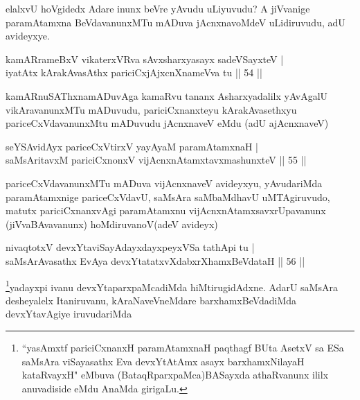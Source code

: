 \begin{artha}
elalxvU hoVgidedx Adare inunx beVre yAvudu uLiyuvudu? A jiVvanige paramAtamxna BeVdavanunxMTu  mADuva jAcnxnavoMdeV uLidiruvudu, adU avideyxye.
\end{artha}

\begin{shl}
kamAR\s \s rameBxV vikaterxVRva sAvxsharxyasayx sadeVSayxteV |\\
iyatAtx kArakAvasAthx pariciCxjAjxcnXnameVva tu \hfill || 54 ||
\end{shl}

\begin{artha}
kamARnuSAThxnamADuvAga kamaRvu tananx Asharxyadalilx yAvAgalU vikAravanunxMTu mADuvudu, pariciCxnanxteyu kArakAvasethxyu pariceCxVdavanunxMtu mADuvudu jAcnxnaveV eMdu (adU ajAcnxnaveV)
\end{artha}


\begin{shl}
seYSA\s vidAyx pariceCxVtirxV yayA\s yaM paramAtamxnaH |\\
saMsAritavxM pariciCxnonxV vijAcnxnAtamxtavxmashunxteV \hfill || 55 ||
\end{shl}

\begin{artha}
pariceCxVdavanunxMTu mADuva vijAcnxnaveV avideyxyu, yAvudariMda paramAtamxnige 
pariceCxVdavU, saMsAra saMbaMdhavU uMTAgiruvudo, matutx pariciCxnanxvAgi paramAtamxnu 
vijAcnxnAtamxsavxrUpavanunx (jiVvaBAvavanunx) hoMdiruvanoV(adeV avideyx)
\end{artha}

\begin{shl}
nivaqtotxV devxYtaviSayAdayxdayxpeyxVSa tathA\s pi tu |\\
saMsArAvasathx EvAya devxYtatatxvXdabxrXhamxBeVdataH \hfill || 56 ||
\end{shl}

\begin{artha}
\footnote{``yasAmxtf pariciCxnanxH paramAtamxnaH paqthagf BUta AsetxV sa ESa saMsAra viSayasathx Eva devxYtAtAmx asayx barxhamxNilayaH kataRvayxH" eMbuva (BataqRparxpaMca)BASayxda athaRvanunx ililx anuvadiside eMdu AnaMda girigaLu.}yadayxpi ivanu devxYtaparxpaMcadiMda hiMtirugidAdxne. AdarU saMsAra desheyalelx Itaniruvanu, kAraNaveVneMdare barxhamxBeVdadiMda devxYtavAgiye iruvudariMda
\end{artha}

